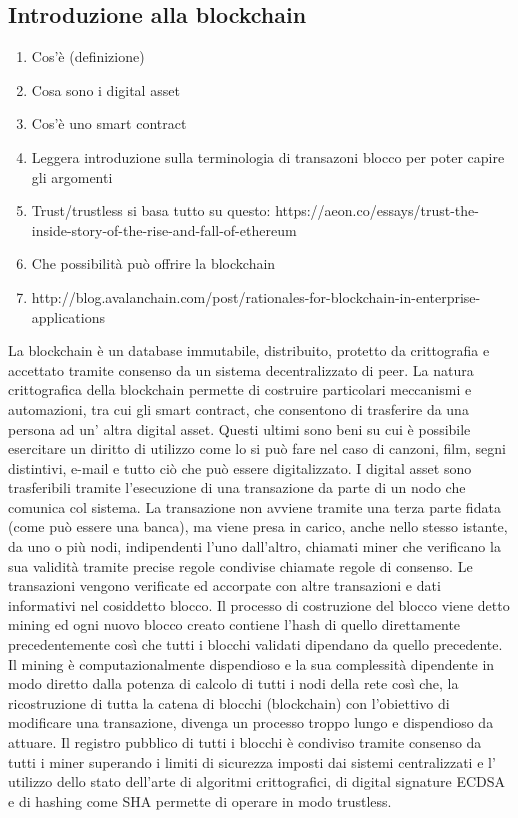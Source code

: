 	\subsection{Introduzione alla blockchain}
	\begin{enumerate}
		\item \checkbox Cos'è (definizione)
		\item \checkbox Cosa sono i digital asset
		\item \uncheckedbox Cos'è uno smart contract
		\item \checkbox Leggera introduzione sulla terminologia di transazoni blocco per poter capire gli argomenti
		\item \uncheckedbox Trust/trustless si basa tutto su questo: https://aeon.co/essays/trust-the-inside-story-of-the-rise-and-fall-of-ethereum
		\item \checkbox Che possibilità può offrire la blockchain
		\item \uncheckedbox http://blog.avalanchain.com/post/rationales-for-blockchain-in-enterprise-applications
	\end{enumerate}
\fi
	La blockchain è un database immutabile, distribuito, protetto da crittografia e accettato tramite consenso da un sistema decentralizzato di peer. La natura crittografica della blockchain permette di costruire particolari meccanismi e automazioni, tra cui gli smart contract, che consentono di trasferire da una persona ad un' altra digital asset\cite{peters2016understanding}. 
	Questi ultimi sono beni su cui è possibile esercitare un diritto di utilizzo come lo si può fare nel caso di canzoni, film, segni distintivi, e-mail e tutto ciò che può essere digitalizzato.
	I digital asset sono trasferibili tramite l'esecuzione di una transazione da parte di un nodo che comunica col sistema. 
	La transazione non avviene tramite una terza parte fidata (come può essere una banca), ma viene presa in carico, anche nello stesso istante, da uno o più nodi, indipendenti l'uno dall'altro, chiamati miner che verificano la sua validità tramite precise regole condivise chiamate regole di consenso. 
	Le transazioni vengono verificate ed accorpate con altre transazioni e dati informativi nel cosiddetto blocco.
	Il processo di costruzione del blocco viene detto mining ed ogni nuovo blocco creato contiene l'hash di quello direttamente precedentemente così che tutti i blocchi validati dipendano da quello precedente.
	Il mining è computazionalmente dispendioso e la sua complessità dipendente in modo diretto dalla potenza di calcolo di tutti i nodi della rete così che, la ricostruzione di tutta la catena di blocchi (blockchain) con l'obiettivo di modificare una transazione, divenga un processo troppo lungo e dispendioso da attuare.
	Il registro pubblico di tutti i blocchi è condiviso tramite consenso da tutti i miner superando i limiti di sicurezza imposti dai sistemi centralizzati e l' utilizzo dello stato dell'arte di algoritmi crittografici, di digital signature ECDSA e di hashing come SHA permette di operare in modo trustless.
	

